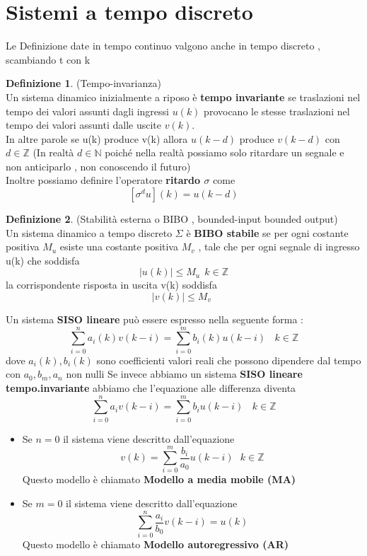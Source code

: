 \documentclass{article}
\theoremstyle{definition}
\newtheorem*{definizione}{Definizione}
\newcommand{\sisdiscr}{\sum_{i=0}^n a_iv(k-i)=\sum_{i=0}^m b_iu(k-i) \ \ \ \ k \in \mathbb{Z}}
\begin{document}
	
	
	
	
	
	
	
	
	
	
	
	
	
	
	
	\newpage
	\section{Sistemi a tempo discreto}
	Le Definizione date in tempo continuo valgono anche in tempo discreto , scambiando t con k 
	\begin{definizione}(Tempo-invarianza)\\
		Un sistema dinamico inizialmente a riposo è \textbf{tempo invariante} se traslazioni nel tempo dei valori assunti dagli ingressi $u(k)$ provocano le stesse traslazioni nel tempo dei valori assunti dalle uscite $v(k)$.\\
		In altre parole se u(k) produce v(k) allora $u(k-d)$ produce $v(k-d)$ con $d \in \mathbb{Z}$ (In realtà $d \in \mathbb{N}$ poiché nella realtà possiamo solo ritardare un segnale e non anticiparlo , non conoscendo il futuro)\\
		Inoltre possiamo definire l'operatore \textbf{ritardo $\sigma$ } come 
		$$[\sigma^d u](k)=u(k-d)$$
			\end{definizione}
	\begin{definizione}(Stabilità esterna o BIBO , bounded-input bounded output)\\
		Un sistema dinamico a tempo discreto $\Sigma$ è \textbf{BIBO stabile }se per ogni costante positiva $M_u$ esiste una costante positiva $M_v$ , tale che per ogni segnale di ingresso u(k) che soddisfa 
		$$|u(k)|\leq M_u \ \  k \in \mathbb{Z}$$
		la corrispondente risposta in uscita v(k) soddisfa
		$$|v(k)|\leq M_v \ \  \textbf{} $$
	\end{definizione}
	Un sistema \textbf{SISO lineare} può essere espresso nella seguente forma : 
	$$\sum_{i=0}^n a_i(k)v(k-i)=\sum_{i=0}^m b_i(k)u(k-i) \ \ \ \ k \in \mathbb{Z}$$
	dove $a_i(k),b_i(k)$ sono coefficienti  valori reali che possono dipendere dal tempo con $a_0,b_m,a_n$ non nulli
	Se invece abbiamo un sistema \textbf{SISO lineare tempo.invariante} abbiamo che l'equazione alle differenza diventa 
	\begin{equation}
		\sisdiscr
	\end{equation}
	\begin{itemize}
		\item Se $n=0$ il sistema viene descritto dall'equazione 
		$$v(k)=\sum_{i=0}^{m}\frac{b_i}{a_0}u(k-i)  \ \ \ k \in \mathbb{Z}$$
		Questo modello è chiamato \textbf{Modello a media mobile (MA)}
		\item Se $m=0$ il sistema viene descritto dall'equazione
		$$\sum_{i=0}^{n}\frac{a_i}{b_0}v(k-i)=u(k)$$
		Questo modello è chiamato \textbf{Modello autoregressivo (AR)}
	\end{itemize}
\end{document}

